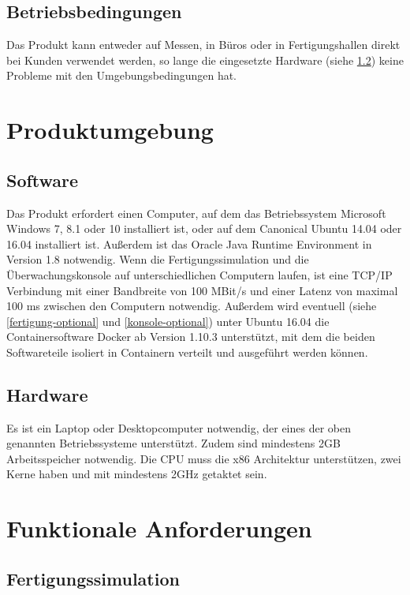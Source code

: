 \documentclass[parskip=full]{scrartcl}
\begin{document}
\subsection{Betriebsbedingungen}
Das Produkt kann entweder auf Messen, in Büros oder in Fertigungshallen direkt bei Kunden verwendet werden,
so lange die eingesetzte Hardware (siehe \ref{Hardware}) keine Probleme mit den Umgebungsbedingungen hat.

\pagebreak
\section{Produktumgebung}
\subsection{Software}
Das Produkt erfordert einen Computer, auf dem das Betriebssystem Microsoft Windows 7, 8.1 oder 10 installiert ist,
oder auf dem Canonical Ubuntu 14.04 oder 16.04 installiert ist. Außerdem ist das Oracle Java Runtime Environment in Version 1.8
notwendig. Wenn die Fertigungssimulation und die Überwachungskonsole auf unterschiedlichen Computern laufen,
ist eine TCP/IP Verbindung mit einer Bandbreite von 100 MBit/s und einer Latenz von maximal 100 ms zwischen den Computern notwendig.
Außerdem wird eventuell (siehe \ref{fertigung-optional} und \ref{konsole-optional}) unter Ubuntu 16.04 die Containersoftware Docker
ab Version 1.10.3 unterstützt, mit dem die beiden Softwareteile isoliert in Containern verteilt und ausgeführt werden können.

\subsection{Hardware}
\label{Hardware}
Es ist ein Laptop oder Desktopcomputer notwendig, der eines der oben genannten Betriebssysteme unterstützt.
Zudem sind mindestens 2GB Arbeitsspeicher notwendig. Die CPU muss die x86 Architektur unterstützen, zwei Kerne haben und mit
mindestens 2GHz getaktet sein.

\pagebreak
\section{Funktionale Anforderungen}
\subsection{Fertigungssimulation}
\end{document}
